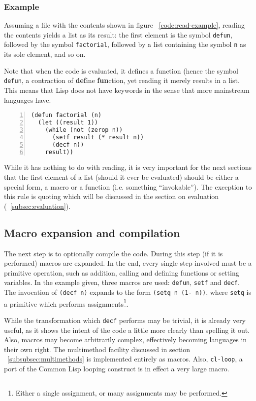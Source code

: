 \documentclass[a4paper,10pt,twoside]{report}
\newcommand{\cl}{Common Lisp}
\newcommand{\sym}[1]{\texttt{#1}}
\newcommand{\fun}[1]{\texttt{#1}}
\begin{document}
\subsubsection{Example}
\label{subsubsec:read-example}

Assuming a file with the contents shown in figure ~\ref{code:read-example},
reading the contents yields a list as its result: the first element is the
symbol \fun{defun}, followed by the symbol \sym{factorial}, followed by a list
containing the symbol \sym{n} as its sole element, and so on.

Note that when the code is evaluated, it defines a function (hence the symbol
\sym{defun}, a contraction of \textbf{def}ine \textbf{fun}ction, yet reading it
merely results in a list.  This means that Lisp does not have keywords in the
sense that more mainstream languages have.

\begin{lstlisting}[style=lispcode,label={code:read-example},caption={A function
which calculates the factorial of its argument.},numbers=left]
(defun factorial (n)
  (let ((result 1))
    (while (not (zerop n))
      (setf result (* result n))
      (decf n))
    result))
\end{lstlisting}

While it has nothing to do with reading, it is very important for the next
sections that the first element of a list (should it ever be evaluated) should
be either a special form, a macro or a function (i.e. something ``invokable'').
The exception to this rule is quoting which will be discussed in the section on
evaluation (~\ref{subsec:evaluation}).

\subsection{Macro expansion and compilation}
\label{subsec:compilation}

The next step is to optionally compile the code.  During this step (if it is
performed) macros are expanded.  In the end, every single step involved must be
a primitive operation, such as addition, calling and defining functions or
setting variables.  In the example given, three macros are used: \fun{defun},
\fun{setf} and \fun{decf}.  The invocation of \fun{(decf n)} expands to the form
\texttt{(setq n (1- n))}, where \fun{setq} is a primitive which performs
assignments\footnote{Either a single assignment, or many assignments may be
  performed.}.

While the transformation which \fun{decf} performs may be trivial, it is already
very useful, as it shows the intent of the code a little more clearly than
spelling it out.  Also, macros may become arbitrarily complex, effectively
becoming languages in their own right.  The multimethod facility discussed in
section ~\ref{subsubsec:multimethods} is implemented entirely as macros.  Also,
\fun{cl-loop}, a port of the \cl{} looping construct is in effect a very large
macro.
\end{document}
